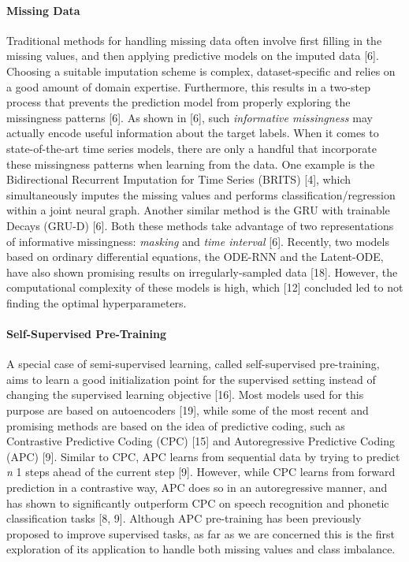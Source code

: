 \documentclass{article}
\begin{document}
\paragraph{Missing Data}
Traditional methods for handling missing data often involve first filling in the missing values, 
and then applying predictive models on the imputed data [6].
Choosing a suitable imputation scheme is complex, dataset-specific and relies on a good amount of domain expertise. Furthermore, this results in a two-step process that prevents
the prediction model from properly exploring the missingness patterns
[6].
As shown in [6], such \textit{informative missingness} may 
actually encode useful information about the target labels.
When it comes to state-of-the-art time series models, there are only a handful that incorporate these missingness patterns when learning from the data. One example is the Bidirectional Recurrent Imputation for Time Series (BRITS) [4],
which simultaneously imputes the missing values and performs classification/regression within a joint neural graph.
Another similar method is the GRU with trainable Decays (GRU-D) [6].
Both these methods
take advantage of two representations of informative missingness: \textit{masking} and \textit{time interval} [6].
Recently, two models based on ordinary differential equations, the ODE-RNN and the Latent-ODE, have also shown promising results on irregularly-sampled data [18].
However, the computational complexity of these models is high, which [12] concluded led to not finding the optimal hyperparameters.





\paragraph{Self-Supervised Pre-Training}
A special case of semi-supervised learning, called self-supervised pre-training, aims to learn a good initialization point for the supervised setting instead of changing the supervised learning objective [16].
Most models used for this purpose are based on autoencoders [19], while some of the most recent and promising methods 
are based on the idea of predictive coding, such as Contrastive Predictive Coding (CPC) [15]
and Autoregressive Predictive Coding (APC) [9].
Similar to CPC, APC learns from sequential data by trying to predict \textit{n}  1 steps ahead of the current step [9]. However, while CPC learns from forward prediction in a contrastive way, APC does so in an autoregressive manner, and has shown to significantly outperform CPC on speech recognition and phonetic classification tasks [8, 9]. Although APC pre-training has been previously proposed to improve supervised tasks, as far as we are concerned this is the first exploration of its application to handle both missing values and class imbalance. 
\end{document}
